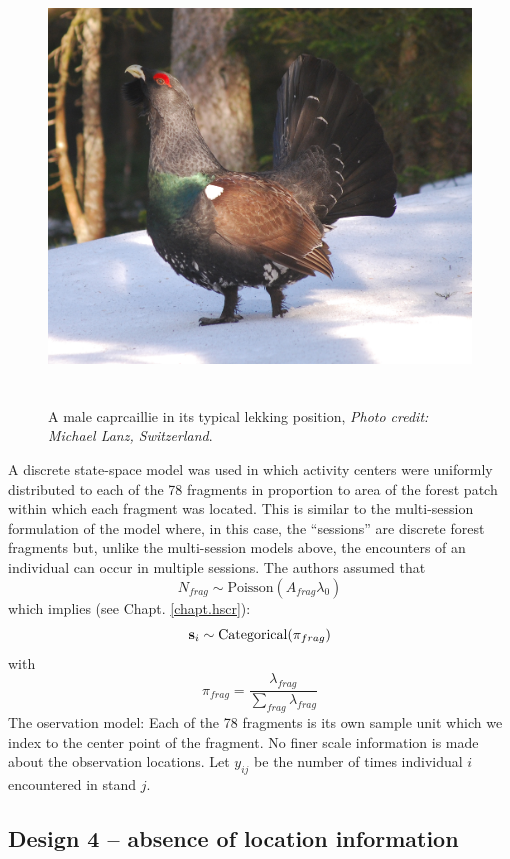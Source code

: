 \begin{figure}
\centering
\includegraphics[width=5in,height=4.21in]{Ch15-searchencounter/figs/capercaillie_lanz.jpg}
\label{searchencounter.fig.capercaillie}
\caption{A male caprcaillie in its typical lekking position,
{\it Photo credit: Michael Lanz, Switzerland}.
}
\end{figure}

A discrete state-space model was used in which 
activity centers were uniformly distributed to each
of the 78 fragments in proportion to area of the forest patch within
which each fragment was located.  This is similar to the multi-session
formulation of the model where, in this case, the ``sessions'' are
discrete forest fragments but, unlike the multi-session models above,
the encounters of an individual can occur in multiple sessions.  The
authors assumed that
\[
 N_{frag} \sim \mbox{Poisson}( A_{frag} \lambda_{0} )
\]
which implies (see Chapt. \ref{chapt.hscr}):
\[
{\bf s}_{i} \sim  \mbox{Categorical}(  \pi_{frag} )
\]
with
\[
 \pi_{frag} = \frac{ \lambda_{frag} }{\sum_{frag} \lambda_{frag}}
\]
The oservation model: Each of the 78 fragments is its own sample unit which we index to the
center point of the fragment. No finer scale information is made about
the observation locations.
Let $y_{ij}$ be  the number of times individual $i$ encountered in stand $j$.

\subsection{Design 4 -- absence of location information}

